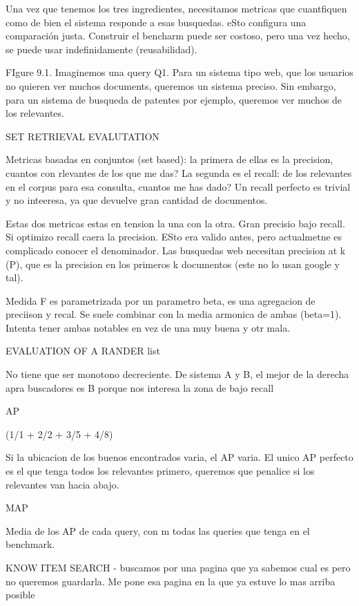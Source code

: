 Una vez que tenemos los tres ingredientes, necesitamos metricas que cuantfiquen como de bien el sistema responde a esas busquedas. eSto configura una comparación justa. Construir el bencharm puede ser costoso, pero una vez hecho, se puede usar indefinidamente (reusabilidad). 

FIgure 9.1. Imaginemos una query Q1. Para un sistema tipo web, que los usuarios no quieren ver muchos documents, queremos un sistema preciso. Sin embargo, para un sistema de busqueda de patentes por ejemplo, queremos ver muchos de los relevantes. 

SET RETRIEVAL EVALUTATION

Metricas basadas en conjuntos (set based): la primera de ellas es la precision, cuantos con rlevantes de los que me das? La segunda es el recall: de los relevantes en el corpus para esa consulta, cuantos me has dado? Un recall perfecto es trivial y no inteeresa, ya que devuelve gran cantidad de documentos. 

Estas dos metricas estas en tension la una con la otra. Gran precisio bajo recall. Si optimizo recall caera la precision. ESto era valido antes, pero actualmetne es complicado conocer el denominador. Las busquedas web necesitan precision at k (P\@k), que es la precision en los primeros k documentos (este no lo usan google y tal).

Medida F es parametrizada por un parametro beta, es una agregacion de preciison y recal. Se suele combinar con la media armonica de ambas (beta=1). Intenta tener ambas notables en vez de una muy buena y otr mala.

EVALUATION OF A RANDER list

No tiene que ser monotono decreciente. De sistema A y B, el mejor de la derecha apra buscadores es B porque nos interesa la zona de bajo recall 


AP 

(1/1 + 2/2 + 3/5 + 4/8)

Si la ubicacion de los buenos encontrados varia, el AP varia. El unico AP perfecto es el que tenga todos los relevantes primero, queremos que penalice si los relevantes van hacia abajo. 

MAP 

Media de los AP de cada query, con m todas las queries que tenga en el benchmark. 

KNOW ITEM SEARCH - buscamos por una pagina que ya sabemos cual es pero no queremos guardarla. Me pone esa pagina en la que ya estuve lo mas arriba posible

